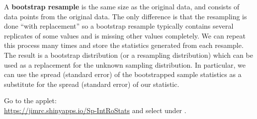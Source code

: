   A {\bf bootstrap resample} is the same size as the original data, and
  consists of data points from the original data.  The only difference
  is that the resampling is done ``with replacement'' so a bootstrap
  resample typically contains several replicates of some values and is
  missing other values completely.  We can repeat this process many
  times and store the statistics generated from each resample.  The
  result is a bootstrap distribution (or a resampling distribution)
  which can be used as a replacement for the unknown sampling
  distribution.  In particular, we can use the spread (standard error)
  of the bootstrapped sample statistics as a substitute for the spread
  (standard error) of our statistic.  

   

Go to  the applet:\\
\url{https://jimrc.shinyapps.io/Sp-IntRoStats} and
select under  .
\vspace{-.2in}
